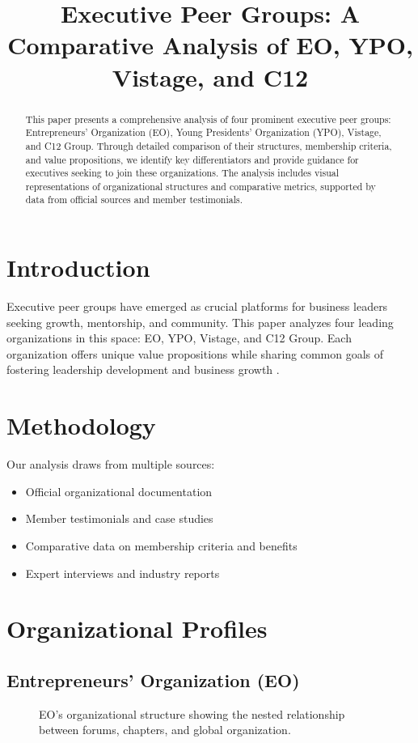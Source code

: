 \documentclass[conference]{IEEEtran}
\title{Executive Peer Groups: A Comparative Analysis of EO, YPO, Vistage, and C12}
\author{\IEEEauthorblockN{Tian Shao}
\IEEEauthorblockA{\textit{XU Exponential University} \\
Shanghai, China \\
t.shao@student.xu-university.de}
}
\begin{document}
\maketitle

\begin{abstract}
This paper presents a comprehensive analysis of four prominent executive peer groups: Entrepreneurs' Organization (EO), Young Presidents' Organization (YPO), Vistage, and C12 Group. Through detailed comparison of their structures, membership criteria, and value propositions, we identify key differentiators and provide guidance for executives seeking to join these organizations. The analysis includes visual representations of organizational structures and comparative metrics, supported by data from official sources and member testimonials.
\end{abstract}

\section{Introduction}
Executive peer groups have emerged as crucial platforms for business leaders seeking growth, mentorship, and community. This paper analyzes four leading organizations in this space: EO, YPO, Vistage, and C12 Group. Each organization offers unique value propositions while sharing common goals of fostering leadership development and business growth \cite{crews2020executive}.

\section{Methodology}
Our analysis draws from multiple sources:
\begin{itemize}
\item Official organizational documentation
\item Member testimonials and case studies
\item Comparative data on membership criteria and benefits
\item Expert interviews and industry reports
\end{itemize}

\section{Organizational Profiles}

\subsection{Entrepreneurs' Organization (EO)}
\begin{figure}[t]
\centering
{}
\caption{EO's organizational structure showing the nested relationship between forums, chapters, and global organization.}
\label{fig:eo_structure}
\end{figure}
\end{document}

